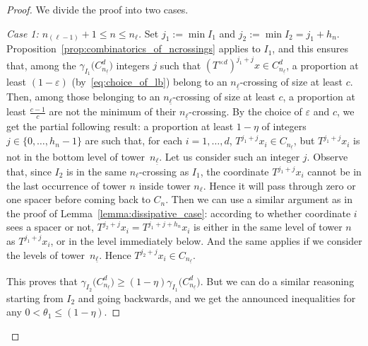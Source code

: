 \documentclass[AHL,Unicode,longabstracts]{cedram}
\newcommand{\egdef}{:=}
\newcommand{\cd}{C^{d}}
\newcommand{\td}{T^{\times d}}
\newcommand{\lb}{\underline{\ell}}
\newcommand{\Gam}[1]{\gamma_{#1}\bigl(\cd_{n_{\lb}}\bigr)}
\newenvironment{step}[1]{\begin{proof}[#1]}{\let\qed\relax \end{proof}}
\begin{document}
\goodbreak
\begin{proof}
We divide the proof into two cases.

\begin{step}{Case 1: $n_{(\ell-1)}+1\le n\le n_\ell$}
Set $j_1\egdef \min I_1$ and $j_2\egdef\min I_2=j_1+h_n$. Proposition~\ref{prop:combinatorics_of_ncrossings} applies to $I_1$, and this ensures that, among the $\Gam{I_1}$ integers $j$ such that $(\td)^{j_1+j}x\in \cd_{n_{\lb}}$, a proportion at least $(1-\varepsilon)$ (by~\eqref{eq:choice_of_lb}) belong to an $n_{\lb}$-crossing of size at least $c$. Then, among those belonging to an $n_{\lb}$-crossing of size at least $c$, a proportion at least $\frac{c-1}{c}$ are not the minimum of their $n_{\lb}$-crossing. By the choice of $\varepsilon$ and $c$, we get the partial following result: a proportion at least $1-\eta$ of integers $j\in\{0,\ldots,h_n-1\}$ are such that, for each $i=1,\ldots,d$, $T^{j_1+j}x_i\in C_{n_{\lb}}$, but $T^{j_1+j}x_i$ is not in the bottom level of tower~$n_{\lb}$. Let us consider such an integer $j$. Observe that, since $I_2$ is in the same $n_\ell$-crossing as $I_1$, the coordinate $T^{j_1+j}x_i$ cannot be in the last occurrence of tower $n$ inside tower $n_{\ell}$. Hence it will pass through zero or one spacer before coming back to $C_{n}$. Then we can use a similar argument as in the proof of Lemma~\ref{lemma:dissipative_case}: according to whether coordinate $i$ sees a spacer or not, $T^{j_2+j}x_i=T^{j_1+j+h_n}x_i$ is either in the same level of tower $n$ as $T^{j_1+j}x_i$, or in the level immediately below. And the same applies if we consider the levels of tower~$n_{\lb}$. Hence $T^{j_2+j}x_i\in C_{n_{\lb}}$.

This proves that $\Gam{I_2}\ge (1-\eta) \Gam{I_1}$. But we can do a similar reasoning starting from $I_2$ and going backwards, and we get the announced inequalities for any $0<\theta_1\le (1-\eta)$.
\end{step}


\end{proof}
\end{document}
